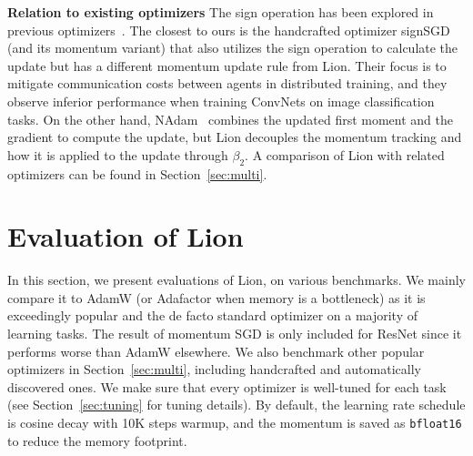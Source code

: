 \documentclass{article}
\newcommand{\name}{Lion}
\begin{document}



\textbf{Relation to existing optimizers} The sign operation has been explored in previous optimizers~\citep{riedmiller1993rprop, bernstein2018signsgd}. The closest to ours is
the handcrafted optimizer signSGD~\citep{bernstein2018signsgd} (and its momentum variant) that also utilizes the sign operation to calculate the update but has a different momentum update rule from \name{}. 
Their focus is to mitigate communication costs between agents in distributed training, and they observe inferior performance when training ConvNets on image classification tasks.
On the other hand, NAdam~\citep{dozat2016nadam} combines the updated first moment and the gradient to compute the update, but \name{} decouples the momentum tracking and how it is applied to the update through $\beta_2$. 
A comparison of \name{} with related optimizers can be found in Section~\ref{sec:multi}.




\section{Evaluation of \name{}}
\label{sec:eval}

In this section, we present evaluations of \name{}, on various benchmarks. 
We mainly compare it to AdamW (or Adafactor when memory is a bottleneck) as it is exceedingly popular and the de facto standard optimizer on a majority of learning tasks. 
The result of momentum SGD is only included for ResNet since it performs worse than AdamW elsewhere.
We also benchmark other popular optimizers in Section~\ref{sec:multi}, including handcrafted and automatically discovered ones.
We make sure that every optimizer is well-tuned for each task (see Section~\ref{sec:tuning} for tuning details).
By default, the learning rate schedule is cosine decay with 10K steps warmup, and the momentum is saved as \texttt{bfloat16} to reduce the memory footprint.
\end{document}
